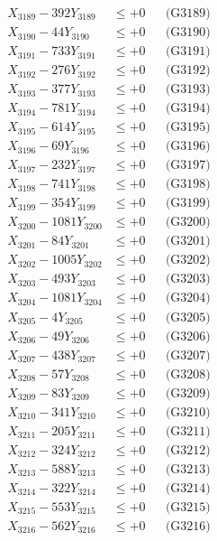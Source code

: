 \documentclass[a4paper,10pt]{article}
\begin{document}
{\begin{align}
X_{3189} - 392Y_{3189} &\leq +0 && \text{(G3189)} \\
X_{3190} - 44Y_{3190} &\leq +0 && \text{(G3190)} \\
\allowbreak
X_{3191} - 733Y_{3191} &\leq +0 && \text{(G3191)} \\
X_{3192} - 276Y_{3192} &\leq +0 && \text{(G3192)} \\
X_{3193} - 377Y_{3193} &\leq +0 && \text{(G3193)} \\
X_{3194} - 781Y_{3194} &\leq +0 && \text{(G3194)} \\
X_{3195} - 614Y_{3195} &\leq +0 && \text{(G3195)} \\
X_{3196} - 69Y_{3196} &\leq +0 && \text{(G3196)} \\
X_{3197} - 232Y_{3197} &\leq +0 && \text{(G3197)} \\
X_{3198} - 741Y_{3198} &\leq +0 && \text{(G3198)} \\
X_{3199} - 354Y_{3199} &\leq +0 && \text{(G3199)} \\
X_{3200} - 1081Y_{3200} &\leq +0 && \text{(G3200)} \\
\allowbreak
X_{3201} - 84Y_{3201} &\leq +0 && \text{(G3201)} \\
X_{3202} - 1005Y_{3202} &\leq +0 && \text{(G3202)} \\
X_{3203} - 493Y_{3203} &\leq +0 && \text{(G3203)} \\
X_{3204} - 1081Y_{3204} &\leq +0 && \text{(G3204)} \\
X_{3205} - 4Y_{3205} &\leq +0 && \text{(G3205)} \\
X_{3206} - 49Y_{3206} &\leq +0 && \text{(G3206)} \\
X_{3207} - 438Y_{3207} &\leq +0 && \text{(G3207)} \\
X_{3208} - 57Y_{3208} &\leq +0 && \text{(G3208)} \\
X_{3209} - 83Y_{3209} &\leq +0 && \text{(G3209)} \\
X_{3210} - 341Y_{3210} &\leq +0 && \text{(G3210)} \\
\allowbreak
X_{3211} - 205Y_{3211} &\leq +0 && \text{(G3211)} \\
X_{3212} - 324Y_{3212} &\leq +0 && \text{(G3212)} \\
X_{3213} - 588Y_{3213} &\leq +0 && \text{(G3213)} \\
X_{3214} - 322Y_{3214} &\leq +0 && \text{(G3214)} \\
X_{3215} - 553Y_{3215} &\leq +0 && \text{(G3215)} \\
X_{3216} - 562Y_{3216} &\leq +0 && \text{(G3216)} \\

\end{align}}
\end{document}
